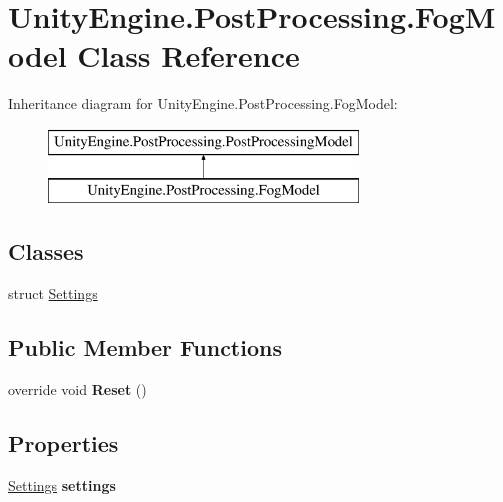 \hypertarget{class_unity_engine_1_1_post_processing_1_1_fog_model}{}\section{Unity\+Engine.\+Post\+Processing.\+Fog\+Model Class Reference}
\label{class_unity_engine_1_1_post_processing_1_1_fog_model}
Inheritance diagram for Unity\+Engine.\+Post\+Processing.\+Fog\+Model\+:\begin{figure}[H]
\begin{center}
\leavevmode
\includegraphics[height=2.000000cm]{class_unity_engine_1_1_post_processing_1_1_fog_model}
\end{center}
\end{figure}
\subsection*{Classes}
\begin{DoxyCompactItemize}
\item 
struct \hyperlink{struct_unity_engine_1_1_post_processing_1_1_fog_model_1_1_settings}{Settings}
\end{DoxyCompactItemize}
\subsection*{Public Member Functions}
\begin{DoxyCompactItemize}
\item 
\mbox{\label{class_unity_engine_1_1_post_processing_1_1_fog_model_ac02075eb4d6e2eaa462eb33ab53c4753}} 
override void {\bfseries Reset} ()
\end{DoxyCompactItemize}
\subsection*{Properties}
\begin{DoxyCompactItemize}
\item 
\mbox{\label{class_unity_engine_1_1_post_processing_1_1_fog_model_a2c7449e70d9d2940455a8fe97644c112}} 
\hyperlink{struct_unity_engine_1_1_post_processing_1_1_fog_model_1_1_settings}{Settings} {\bfseries settings}
\end{DoxyCompactItemize}
